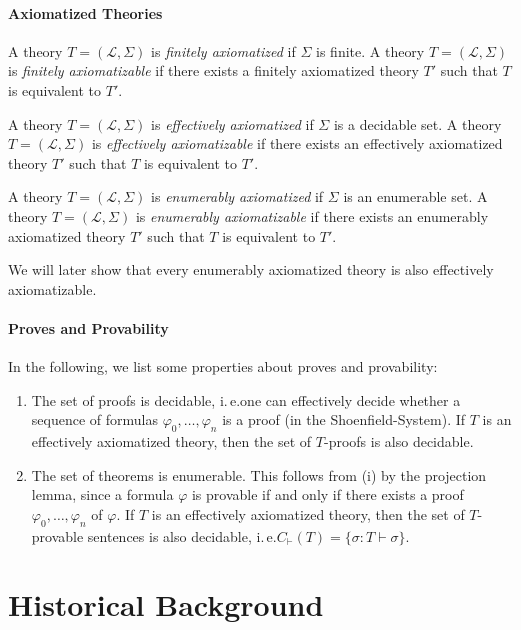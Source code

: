 \paragraph{Axiomatized Theories}
A theory $T= (\mathcal{L}, \Sigma)$ is \textit{finitely axiomatized} if $\Sigma$ is finite. A theory $T = ( \mathcal{L}, \Sigma) $ is \textit{finitely axiomatizable} if there exists a finitely axiomatized theory $T'$ such that $T$ is equivalent to $T'$.

A theory $T = ( \mathcal{L}, \Sigma) $ is \textit{effectively axiomatized} if $\Sigma$ is a decidable set. A theory $T = ( \mathcal{L}, \Sigma) $ is \textit{effectively axiomatizable} if there exists an effectively axiomatized theory $T'$ such that $T$ is equivalent to $T'$. 

A theory $T = ( \mathcal{L}, \Sigma)$ is \textit{enumerably axiomatized} if $\Sigma$ is an enumerable set. A theory $T = ( \mathcal{L}, \Sigma) $ is \textit{enumerably axiomatizable} if there exists an enumerably axiomatized theory $T'$ such that $T$ is equivalent to $T'$.

We will later show that every enumerably axiomatized theory is also effectively axiomatizable. 

\paragraph{Proves and Provability} 
In the following, we list some properties about proves and provability:
\begin{enumerate}
\item The set of proofs is decidable, i.\,e.\@ one can effectively decide whether a sequence of formulas $\varphi_0, \ldots, \varphi_n$ is a proof (in the Shoenfield-System). If $T$ is an effectively axiomatized theory, then the set of $T$-proofs is also decidable.
\item The set of theorems is enumerable. This follows from (i) by the projection lemma, since a formula $\varphi$ is provable if and only if there exists a proof $\varphi_0, \ldots, \varphi_n$ of $\varphi$. If $T$ is an effectively axiomatized theory, then the set of $T$-provable sentences is also decidable, i.\,e.\@ $C_\vdash(T) = \lbrace \sigma : T \vdash \sigma \rbrace$.
\end{enumerate}





\section{Historical Background}

